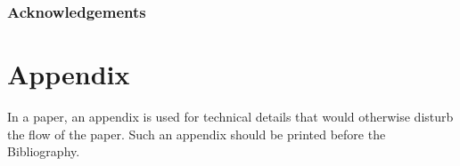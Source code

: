 \section*{Acknowledgements}


\clearpage
\appendix
\part*{Appendix}

In a paper, an appendix is used for technical details that would otherwise disturb the flow of the paper.
Such an appendix should be printed before the Bibliography.

\printbibliography
% 
% 

% 



% 


